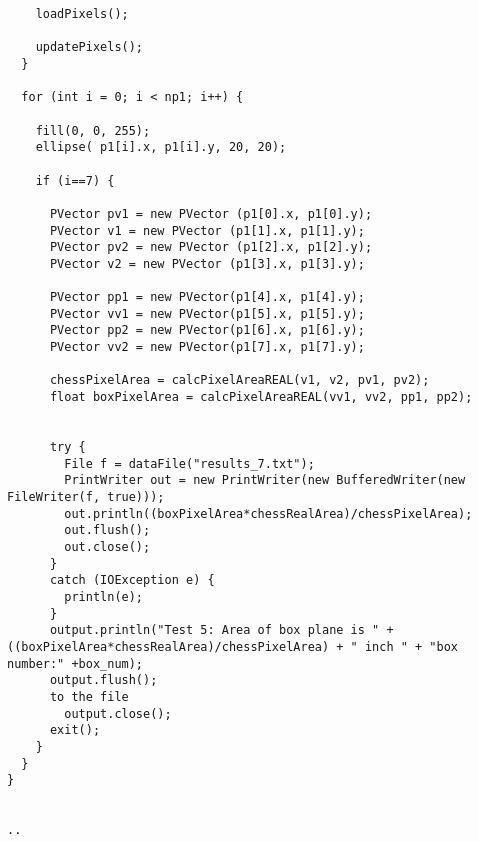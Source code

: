 \documentclass[11pt, twoside, reqno]{book}
\begin{document}
\begin{Verbatim}
    loadPixels(); 

    updatePixels();
  }

  for (int i = 0; i < np1; i++) {

    fill(0, 0, 255);
    ellipse( p1[i].x, p1[i].y, 20, 20);

    if (i==7) {

      PVector pv1 = new PVector (p1[0].x, p1[0].y);
      PVector v1 = new PVector (p1[1].x, p1[1].y);
      PVector pv2 = new PVector (p1[2].x, p1[2].y);
      PVector v2 = new PVector (p1[3].x, p1[3].y);

      PVector pp1 = new PVector(p1[4].x, p1[4].y);
      PVector vv1 = new PVector(p1[5].x, p1[5].y);
      PVector pp2 = new PVector(p1[6].x, p1[6].y);
      PVector vv2 = new PVector(p1[7].x, p1[7].y);

      chessPixelArea = calcPixelAreaREAL(v1, v2, pv1, pv2);
      float boxPixelArea = calcPixelAreaREAL(vv1, vv2, pp1, pp2);  

   
      try { 
        File f = dataFile("results_7.txt");  
        PrintWriter out = new PrintWriter(new BufferedWriter(new FileWriter(f, true)));
        out.println((boxPixelArea*chessRealArea)/chessPixelArea);
        out.flush();
        out.close();
      }
      catch (IOException e) {  
        println(e);
      }
      output.println("Test 5: Area of box plane is " + ((boxPixelArea*chessRealArea)/chessPixelArea) + " inch " + "box number:" +box_num);
      output.flush();  
      to the file
        output.close(); 
      exit();
    }
  }
}


..
\end{Verbatim}
\end{document}
